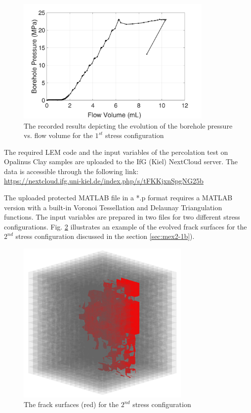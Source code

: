 \begin{figure}[!ht]
\centering
\includegraphics[width=0.85\textwidth]{figures/Amir_Percolation_Flow_a_Data.png}
\caption{The recorded results depicting the evolution of the borehole pressure vs. flow volume for the $1^{st}$ stress configuration}
\label{fig:Amir_Percolation_Flow_a_Data}
\end{figure}

The required LEM code and the input variables of the percolation test on Opalinus Clay samples are uploaded to the IfG (Kiel) NextCloud server. The data is accessible through the following link:\\
\url{https://nextcloud.ifg.uni-kiel.de/index.php/s/tFKKjxnSpgNG25b}

The uploaded protected MATLAB file in a *.p format requires a MATLAB version with a built-in Voronoi Tessellation and Delaunay Triangulation functions. The input variables are prepared in two files for two different stress configurations. Fig. \ref{fig:Amir_ME2_B_Fracture_b_Data}
illustrates an example of the evolved frack surfaces for the $2^{nd}$ stress configuration discussed in the section \ref{sec:mex2-1b}).

\begin{figure}[!ht]
\centering
\includegraphics[width=0.75\textwidth]{figures/Amir_ME2_B_Fracture_b_Data.png}
\caption{The frack surfaces (red) for the $2^{nd}$ stress configuration}
\label{fig:Amir_ME2_B_Fracture_b_Data}
\end{figure}

